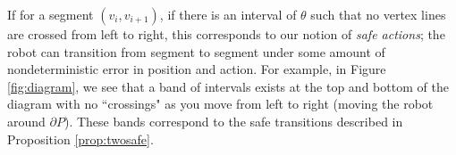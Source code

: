 \documentclass[]{styles/svproc}  %
\begin{document}
If for a segment $(v_i, v_{i+1})$, if there is an interval of $\theta$ such that
no vertex lines are crossed from left to right, this corresponds to our notion
of \emph{safe actions}; the robot can transition from segment to segment under
some amount of nondeterministic error in position and action.
For example, in
Figure \ref{fig:diagram}, we see that a band of intervals exists at the top and
bottom of the diagram with no ``crossings" as you move from left to right
(moving the robot around $\partial P$). These bands correspond to the safe
transitions described in Proposition \ref{prop:twosafe}.

%
\end{document}
